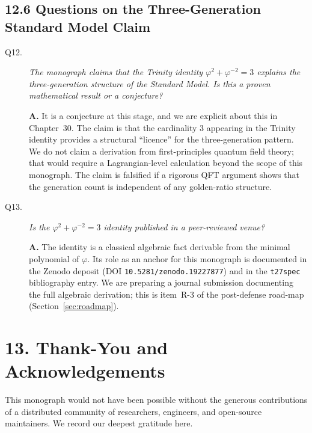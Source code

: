 \subsection{12.6 Questions on the Three-Generation Standard Model
  Claim}\label{sec:qa-sm}

\begin{description}
\item[Q12.] \emph{The monograph claims that the Trinity identity
  $\varphi^2 + \varphi^{-2} = 3$ explains the three-generation structure
  of the Standard Model.  Is this a proven mathematical result or a
  conjecture?}

  \textbf{A.}  It is a conjecture at this stage, and we are explicit
  about this in Chapter~30.  The claim is that the cardinality $3$
  appearing in the Trinity identity provides a structural ``licence'' for
  the three-generation pattern.  We do not claim a derivation from
  first-principles quantum field theory; that would require a
  Lagrangian-level calculation beyond the scope of this monograph.  The
  claim is falsified if a rigorous QFT argument shows that the
  generation count is independent of any golden-ratio structure.

\item[Q13.] \emph{Is the $\varphi^2 + \varphi^{-2} = 3$ identity
  published in a peer-reviewed venue?}

  \textbf{A.}  The identity is a classical algebraic fact derivable from
  the minimal polynomial of $\varphi$.  Its role as an anchor for this
  monograph is documented in the Zenodo deposit (DOI
  \texttt{10.5281/zenodo.19227877}) and in the \texttt{t27spec}
  bibliography entry.  We are preparing a journal submission documenting
  the full algebraic derivation; this is item~R-3 of the post-defense
  road-map (Section~\ref{sec:roadmap}).
\end{description}


\section{13. Thank-You and Acknowledgements}\label{sec:acknowledgements}

This monograph would not have been possible without the generous
contributions of a distributed community of researchers, engineers, and
open-source maintainers.  We record our deepest gratitude here.

